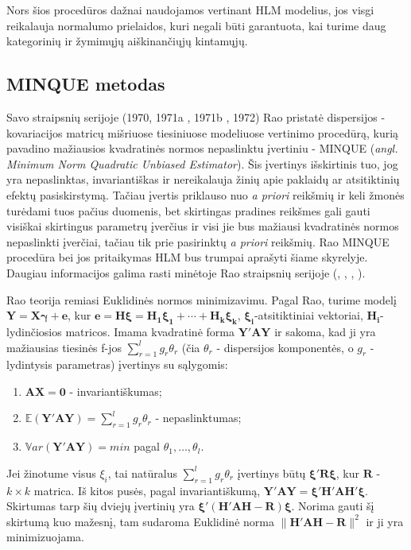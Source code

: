 \documentclass[11pt,a4paper]{article}
\begin{document}
\indent Nors šios procedūros dažnai naudojamos vertinant HLM modelius, jos visgi reikalauja normalumo prielaidos, kuri negali būti garantuota, kai turime daug kategorinių ir žymimųjų aiškinančiųjų kintamųjų.

\subsection{MINQUE metodas}\label{subsec:minque}

\indent Savo straipsnių serijoje (1970\cite{rao1970}, 1971a\cite{rao1971a} , 1971b\cite{rao1971b} , 1972\cite{rao1972}) Rao pristatė dispersijos - kovariacijos matricų mišriuose tiesiniuose modeliuose vertinimo procedūrą, kurią pavadino mažiausios kvadratinės normos nepaslinktu įvertiniu - MINQUE (\textit{angl. Minimum Norm Quadratic Unbiased Estimator}). Šis įvertinys išskirtinis tuo, jog yra nepaslinktas, invariantiškas ir nereikalauja žinių apie paklaidų ar atsitiktinių efektų pasiskirstymą. Tačiau įvertis priklauso nuo \textit{a priori} reikšmių ir keli žmonės turėdami tuos pačius duomenis, bet skirtingas pradines reikšmes gali gauti visiškai skirtingus parametrų įverčius ir visi jie bus mažiausi kvadratinės normos nepaslinkti įverčiai, tačiau tik prie pasirinktų \textit{a priori} reikšmių. Rao MINQUE procedūra bei jos pritaikymas HLM bus trumpai aprašyti šiame skyrelyje. Daugiau informacijos galima rasti minėtoje Rao straipsnių serijoje (\cite{rao1970}, \cite{rao1971a} , \cite{rao1971b} , \cite{rao1972}).

\indent Rao teorija remiasi Euklidinės normos minimizavimu. Pagal Rao, turime modelį $\mathbf{Y}=\mathbf{X}\boldsymbol{\gamma}+\mathbf{e}$, kur $\mathbf{e}=\mathbf{H\boldsymbol{\xi}}=\mathbf{\boldsymbol{H_1\xi_1+\cdots +H_k \xi_k}}$, $\boldsymbol{\xi_i}$-atsitiktiniai vektoriai, $\mathbf{H_i}$-lydinčiosios matricos. Imama kvadratinė forma $\mathbf{Y'AY}$ ir sakoma, kad ji yra mažiausias tiesinės f-jos $\sum^l_{r=1} g_r\theta_r$ (čia $\theta_r$ - dispersijos komponentės, o $g_r$ - lydintysis parametras) įvertinys su sąlygomis:
\begin{enumerate}
\item $\mathbf{AX=0}$ - invariantiškumas;
\item $\mathbb{E}\left(\mathbf{Y'AY}\right)=\sum^l_{r=1} g_r\theta_r$ - nepaslinktumas;
\item $\mathbb{V}ar\left(\mathbf{Y'AY}\right)=min$ pagal $\theta_1, \dots, \theta_l$.
\end{enumerate}

\indent Jei žinotume visus $\xi_i$, tai natūralus $\sum^l_{r=1} g_r\theta_r$ įvertinys būtų $\boldsymbol{\xi'R\xi}$, kur $\mathbf{R}$ - $k\times k$ matrica. Iš kitos pusės, pagal invariantiškumą, $\mathbf{Y'AY=\boldsymbol{\xi'H'AH'\xi}}$. Skirtumas tarp šių dviejų įvertinių yra $\boldsymbol{\xi'\left(H'AH-R\right)\xi}$. Norima gauti šį skirtumą kuo mažesnį, tam sudaroma Euklidinė norma $\|\boldsymbol{H'AH-R}\|^2$ ir ji yra minimizuojama.
\end{document}
